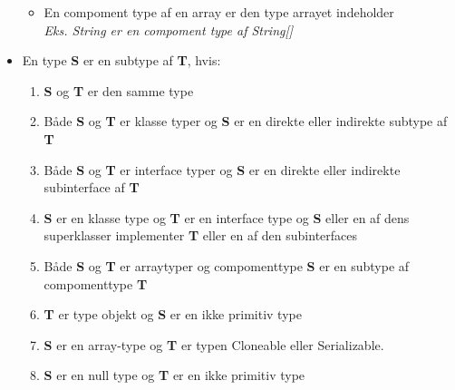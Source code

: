 \documentclass{article}
\begin{document}
\begin{itemize}
\begin{itemize}
\begin{lstlisting}[language=java]
\end{lstlisting}
	\item En compoment type af en array er den type arrayet indeholder \\ \textit{Eks. String er en compoment type af String[]}
	\end{itemize}
	\item En type \textbf{S} er en subtype af \textbf{T}, hvis:
	\begin{enumerate}
		\item \textbf{S} og \textbf{T} er den samme type
		\item Både \textbf{S} og \textbf{T} er klasse typer og \textbf{S} er en direkte eller indirekte subtype af \textbf{T}
		\item Både \textbf{S} og \textbf{T} er interface typer og \textbf{S} er en direkte eller indirekte subinterface af \textbf{T}
		\item \textbf{S} er en klasse type og \textbf{T} er en interface type og \textbf{S} eller en af dens superklasser implementer \textbf{T} eller en af den subinterfaces
		\item Både \textbf{S} og \textbf{T} er arraytyper og compomenttype \textbf{S} er en subtype af compomenttype \textbf{T}
		\item \textbf{T} er type objekt og \textbf{S} er en ikke primitiv type
		\item \textbf{S} er en array-type og \textbf{T} er typen Cloneable eller Serializable.
		\item \textbf{S} er en null type og \textbf{T} er en ikke primitiv type
	\end{enumerate}
\end{itemize}
\end{document}
